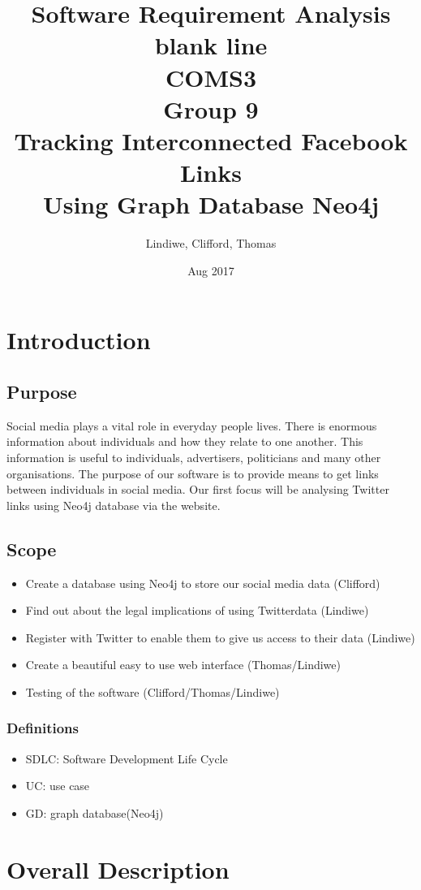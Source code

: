 \documentclass[11pt]{article}
\title{%
Software Requirement Analysis\\\large
\color{white} blank line\\
\color{black}
COMS3\\
Group 9\\
Tracking Interconnected Facebook Links\\
Using Graph Database Neo4j}
\date{Aug 2017}
\author{Lindiwe, Clifford, Thomas}
\begin{document}
\maketitle
{}
\newpage
{}
\section{Introduction}
\subsection{Purpose}
Social media plays a vital role in everyday people lives. There is enormous information about individuals and how they relate to one another. This information is useful to individuals, advertisers, politicians and many other organisations. The purpose of our software is to provide means to get links between individuals in social media. Our first focus will be analysing Twitter links using Neo4j database via the website.

\subsection{Scope}
\begin{itemize}
\item	Create a database using Neo4j to store our social media data (Clifford)
\item Find out about the legal implications of using Twitterdata (Lindiwe)
\item Register with Twitter to enable them to give us access to their data (Lindiwe)
\item Create a beautiful easy to use web interface (Thomas/Lindiwe)
\item Testing of the software (Clifford/Thomas/Lindiwe)
\end{itemize}

\subsubsection{Definitions}
\begin{itemize}
\item SDLC: Software Development Life Cycle
\item UC: use case
\item GD: graph database(Neo4j)
\end{itemize}

\section{Overall Description}
\end{document}
